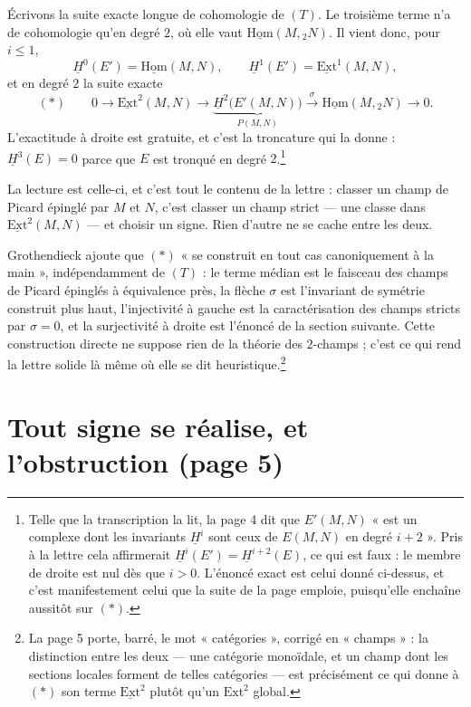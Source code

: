 \documentclass[11pt,a4paper]{article}
\begin{document}
Écrivons la suite exacte longue de cohomologie de $(T)$. Le troisième terme
n'a de cohomologie qu'en degré $2$, où elle vaut
$\underline{\mathrm{Hom}}(M, {}_2N)$. Il vient donc, pour $i \leq 1$,
\[ \underline{H}^0(E') = \underline{\mathrm{Hom}}(M,N), \qquad
   \underline{H}^1(E') = \underline{\mathrm{Ext}}^1(M,N), \]
et en degré $2$ la suite exacte
\[ (*) \qquad 0 \longrightarrow \underline{\mathrm{Ext}}^2(M,N)
   \longrightarrow \underbrace{\underline{H}^2\bigl(E'(M,N)\bigr)}_{P(M,N)}
   \xrightarrow{\ \sigma\ } \underline{\mathrm{Hom}}(M, {}_2 N)
   \longrightarrow 0 . \]
L'exactitude à droite est gratuite, et c'est la troncature qui la donne :
$\underline{H}^3(E) = 0$ parce que $E$ est tronqué en degré
$2$.\footnote{Telle que la transcription la lit, la page 4 dit que
$E'(M,N)$ « est un complexe dont les invariants $\underline{H}^i$ sont ceux de
$E(M,N)$ en degré $i+2$ ». Pris à la lettre cela affirmerait
$\underline{H}^i(E') = \underline{H}^{i+2}(E)$, ce qui est faux : le membre de
droite est nul dès que $i > 0$. L'énoncé exact est celui donné ci-dessus, et
c'est manifestement celui que la suite de la page emploie, puisqu'elle enchaîne
aussitôt sur $(*)$.}

La lecture est celle-ci, et c'est tout le contenu de la lettre : classer un
champ de Picard épinglé par $M$ et $N$, c'est classer un champ strict --- une
classe dans $\underline{\mathrm{Ext}}^2(M,N)$ --- et choisir un signe. Rien
d'autre ne se cache entre les deux.

Grothendieck ajoute que $(*)$ « se construit en tout cas canoniquement à la
main », indépendamment de $(T)$ : le terme médian est le faisceau des champs
de Picard épinglés à équivalence près, la flèche $\sigma$ est l'invariant de
symétrie construit plus haut, l'injectivité à gauche est la caractérisation
des champs stricts par $\sigma = 0$, et la surjectivité à droite est l'énoncé
de la section suivante. Cette construction directe ne suppose rien de la
théorie des $2$-champs ; c'est ce qui rend la lettre solide là même où elle se
dit heuristique.\footnote{La page 5 porte, barré, le mot « catégories »,
corrigé en « champs » : la distinction entre les deux --- une catégorie
monoïdale, et un champ dont les sections locales forment de telles catégories
--- est précisément ce qui donne à $(*)$ son terme $\underline{\mathrm{Ext}}^2$
plutôt qu'un $\mathrm{Ext}^2$ global.}

\section*{Tout signe se réalise, et l'obstruction (page 5)}
\end{document}
